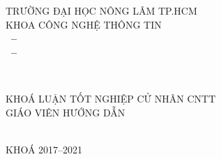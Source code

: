 \begin{titlepage}

  \begin{center}
    TRƯỜNG ĐẠI HỌC NÔNG LÂM TP.HCM\\
    KHOA CÔNG NGHỆ THÔNG TIN\\[2cm]
    
    { \Large \bfseries \MakeUppercase{\tenSVa~--~\mssva~\\\tenSVb~--~\mssvb} \\[1cm] }
    
    { \Large \bfseries \MakeUppercase{\tenKL} \\[2cm] } %
    
    \Large KHOÁ LUẬN TỐT NGHIỆP CỬ NHÂN CNTT\\[2cm]
    
    \Large GIÁO VIÊN HƯỚNG DẪN\\
    \MakeUppercase{\tenGVHD} \\[1cm]
    
    
    \vfill
    KHOÁ 2017--2021
    
  \end{center}
  
\end{titlepage}